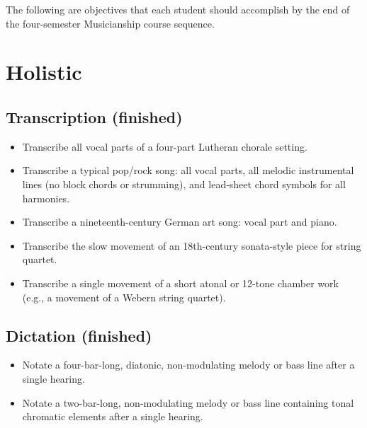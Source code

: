 
\def\mytitle{Learning and mastery objectives for Musicianship sequence}
\def\myauthor{Kris P. Shaffer}
\def\latexmode{memoir}

The following are objectives that each student should accomplish by the end of the four-semester Musicianship course sequence.

\chapter{Holistic}
\label{holistic}

\section{Transcription (finished)}
\label{transcriptionfinished}

\begin{itemize}
\item Transcribe all vocal parts of a four-part Lutheran chorale setting.

\item Transcribe a typical pop\slash rock song: all vocal parts, all melodic instrumental lines (no block chords or strumming), and lead-sheet chord symbols for all harmonies.

\item Transcribe a nineteenth-century German art song: vocal part and piano.

\item Transcribe the slow movement of an 18th-century sonata-style piece for string quartet.

\item Transcribe a single movement of a short atonal or 12-tone chamber work (e.g., a movement of a Webern string quartet).

\end{itemize}

\section{Dictation (finished)}
\label{dictationfinished}

\begin{itemize}
\item Notate a four-bar-long, diatonic, non-modulating melody or bass line after a single hearing.

\item Notate a two-bar-long, non-modulating melody or bass line containing tonal chromatic elements after a single hearing.

\end{itemize}

